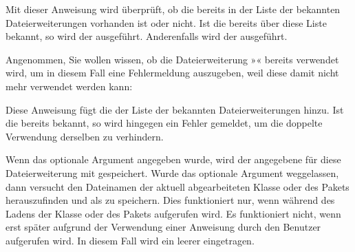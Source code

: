 \begin{Declaration}
\end{Declaration}
Mit dieser Anweisung wird überprüft, ob
die  bereits in der Liste der bekannten
Dateierweiterungen vorhanden ist oder nicht. Ist die 
bereits über diese Liste bekannt, so wird der 
ausgeführt. Anderenfalls wird der  ausgeführt.
\begin{Example}
  Angenommen, Sie wollen wissen, ob die Dateierweiterung »« bereits
  verwendet wird, um in diesem Fall eine Fehlermeldung auszugeben, weil diese
  damit nicht mehr verwendet werden kann:
\begin{lstcode}
\end{lstcode}
\end{Example}
\EndIndexGroup%
\ExampleEndFix


\begin{Declaration}
\end{Declaration}
Diese Anweisung fügt die  der Liste der bekannten
Dateierweiterungen hinzu. Ist die  bereits bekannt, so
wird hingegen ein Fehler gemeldet, um die doppelte Verwendung derselben
 zu verhindern.

Wenn das optionale Argument  angegeben wurde, wird der
angegebene  für diese Dateierweiterung mit gespeichert. Wurde
das optionale Argument weggelassen, dann versucht  den
Dateinamen der aktuell abgearbeiteten Klasse oder des Pakets herauszufinden
und als  zu speichern. Dies funktioniert
nur, wenn  während des Ladens der Klasse oder des Pakets
aufgerufen wird. Es funktioniert nicht, wenn  erst später
aufgrund der Verwendung einer Anweisung durch den Benutzer aufgerufen wird. In
diesem Fall wird ein leerer  eingetragen. 

